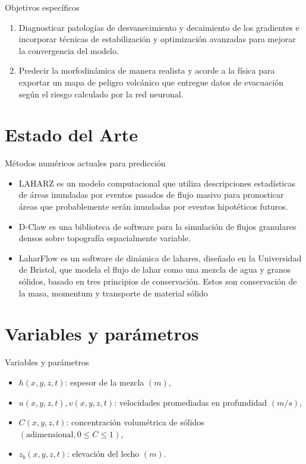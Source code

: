 \documentclass{beamer}
\begin{document}
\begin{frame}
    \begin{block}{Objetivos específicos}
        \begin{enumerate}
            \item Diagnosticar patologías de desvanecimiento y decaimiento de los gradientes e incorporar técnicas de estabilización y optimización avanzadas para mejorar la convergencia del modelo.
            \item Predecir la morfodinámica de manera realista y acorde a la física para exportar un mapa de peligro volcánico que entregue datos de evacuación según el riesgo calculado por la red neuronal.
        \end{enumerate}
    \end{block}
\end{frame}


\section{Estado del Arte}
\begin{frame}{Métodos numéricos actuales para predicción}
\begin{itemize}
    \item LAHARZ es un modelo computacional que utiliza descripciones estadísticas de áreas inundadas por eventos pasados de flujo masivo 
    para pronosticar áreas que probablemente serán inundadas por eventos hipotéticos futuros. \cite{schilling2008using}
    \item D-Claw es una biblioteca de software para la simulación de flujos granulares densos sobre topografía espacialmente variable. \cite{george2025d}
    \item LaharFlow es un software de dinámica de lahares, diseñado en la Universidad de Bristol, que modela el flujo de lahar como una mezcla de agua y granos sólidos, basado en tres principios
    de conservación. Estos son conservación de la masa, momentum y transporte de material sólido \cite{woodhouseshallow}
\end{itemize}

\end{frame}


\section{Variables y parámetros}
\begin{frame}{Variables y parámetros}
\begin{itemize}
    \item $h(x, y, z, t)$: espesor de la mezcla $(m)$,
    \item $u(x, y, z, t), v(x, y, z, t)$: velocidades promediadas en profundidad $(m/s)$,
    \item $C(x, y, z, t)$: concentración volumétrica de sólidos $(\text{adimensional}, 0 \leq C \leq 1)$,
    \item $z_b(x, y, z, t)$: elevación del lecho $(m)$.
\end{itemize}
\end{frame}
\end{document}
